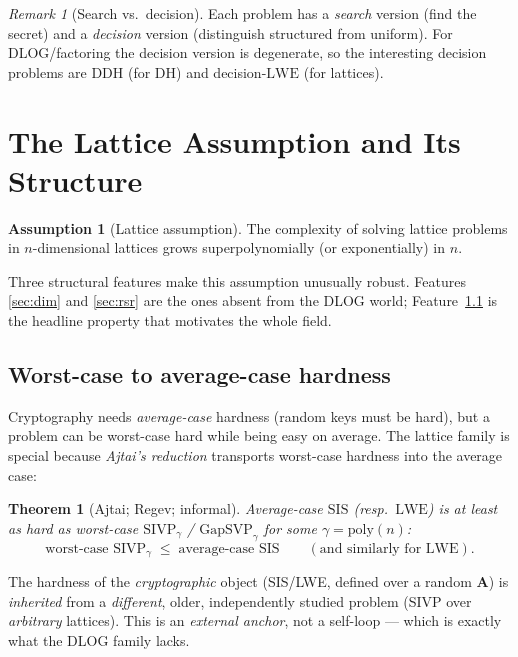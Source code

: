 \documentclass[11pt]{article}
\theoremstyle{definition}
\newtheorem{assumption}[definition]{Assumption}
\theoremstyle{plain}
\newtheorem{theorem}[definition]{Theorem}
\theoremstyle{remark}
\newtheorem{remark}[definition]{Remark}
\newcommand{\vA}{\mathbf{A}}
\newcommand{\ddh}{\mathrm{DDH}}
\newcommand{\lwe}{\mathrm{LWE}}
\newcommand{\sis}{\mathrm{SIS}}
\newcommand{\sivp}{\mathrm{SIVP}}
\newcommand{\gapsvp}{\mathrm{GapSVP}}
\newcommand{\reduces}{\;\leq\;}
\newcommand{\poly}{\mathrm{poly}}
\begin{document}
\begin{remark}[Search vs.\ decision]
Each problem has a \emph{search} version (find the secret) and a \emph{decision} version
(distinguish structured from uniform). For DLOG/factoring the decision version is degenerate,
so the interesting decision problems are $\ddh$ (for DH) and decision-$\lwe$ (for lattices).
\end{remark}

\section{The Lattice Assumption and Its Structure}

\begin{assumption}[Lattice assumption]
The complexity of solving lattice problems in $n$-dimensional lattices grows
superpolynomially (or exponentially) in $n$.
\end{assumption}

Three structural features make this assumption unusually robust. Features
\ref{sec:dim} and \ref{sec:rsr} are the ones absent from the DLOG world;
Feature~\ref{sec:wc-ac} is the headline property that motivates the whole field.

\subsection{Worst-case to average-case hardness}
\label{sec:wc-ac}

Cryptography needs \emph{average-case} hardness (random keys must be hard), but a
problem can be worst-case hard while being easy on average. The lattice family is special
because \emph{Ajtai's reduction} transports worst-case hardness into the average case:

\begin{theorem}[Ajtai; Regev; informal]
Average-case $\sis$ (resp.\ $\lwe$) is at least as hard as worst-case
$\sivp_\gamma$ / $\gapsvp_\gamma$ for some $\gamma=\poly(n)$:
\[
   \text{worst-case } \sivp_\gamma \reduces \text{average-case } \sis
   \qquad(\text{and similarly for } \lwe).
\]
\end{theorem}

\begin{keybox}
The hardness of the \emph{cryptographic} object (SIS/LWE, defined over a random $\vA$) is
\emph{inherited} from a \emph{different}, older, independently studied problem (SIVP over
\emph{arbitrary} lattices). This is an \emph{external anchor}, not a self-loop --- which is
exactly what the DLOG family lacks.
\end{keybox}
\end{document}
